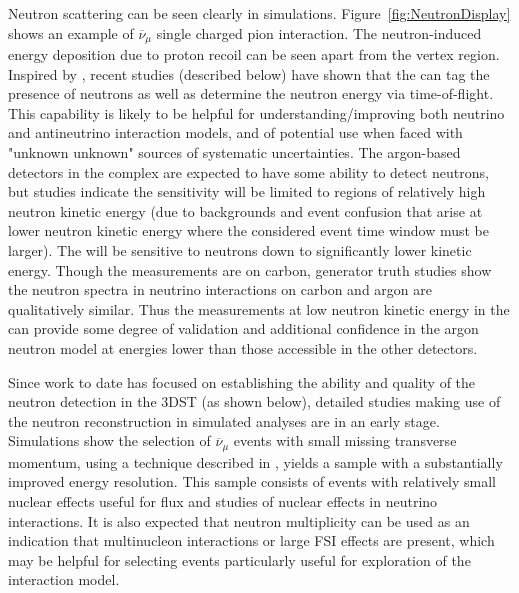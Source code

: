 Neutron scattering can  be seen clearly in  simulations. 
Figure~\ref{fig:NeutronDisplay} shows an example of
$\overline{\nu}_{\mu}$   single charged pion interaction. The neutron-induced energy deposition due to proton recoil can be seen apart from the vertex region. 
Inspired by , recent studies (described below) have shown that the  can tag the presence of neutrons as well as determine the neutron energy via time-of-flight. 
This capability is likely to be helpful for 
understanding/improving both neutrino and antineutrino interaction models, and of potential use when faced with "unknown unknown" sources of systematic uncertainties. The argon-based detectors in the  complex are expected to have some ability to detect neutrons, but studies indicate the sensitivity will be limited to regions of relatively high neutron kinetic energy (due to backgrounds and event confusion that arise at lower neutron kinetic energy where the considered event time window must be larger).  The  will be sensitive to neutrons down to significantly lower kinetic energy.  Though the measurements are on carbon, generator truth studies show the neutron spectra in neutrino interactions on carbon and argon are qualitatively similar. Thus the measurements at low neutron kinetic energy in the  can provide some degree of validation and additional confidence in the argon neutron model at energies lower than those accessible in the other detectors.

Since work to date has focused on establishing the ability and quality of the neutron detection in the 3DST (as shown below), detailed studies making use of the neutron reconstruction in simulated analyses are in an early stage.  Simulations show the selection of $\overline{\nu}_\mu$  events with small missing transverse momentum, using a technique described in \cite{Abe:2018pwo}, yields a sample with a substantially improved energy resolution.  This sample consists of events with relatively small nuclear effects useful for flux and studies of nuclear effects in neutrino interactions.  It is also expected that neutron multiplicity can  be used as an indication that multinucleon interactions or large FSI effects are present, which may be helpful for selecting  events particularly useful for exploration of the interaction model.


